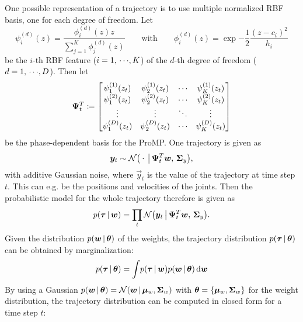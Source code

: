 			One possible representation of a trajectory is to use multiple normalized RBF basis, one for each degree of freedom. Let
			\begin{equation*}
				\psi_i^{(d)}(z) = \frac{\phi_i^{(d)}(z) z}{\sum_{j = 1}^{K} \phi_j^{(d)}(z)}
				\qquad\text{with}\qquad
				\phi_i^{(d)}(z) = \exp{ -\frac{1}{2} \frac{(z - c_i)^2}{h_i} }
			\end{equation*}
			be the \(i\)-th RBF feature (\( i = 1,\,\cdots\!,K \)) of the \(d\)-th degree of freedom (\( d = 1,\,\cdots\!,D \)). Then let
			\begin{equation*}
				\bm{\Psi}_t^T \coloneqq
				\begin{bmatrix}
					\psi_1^{(1)}(z_t) & \psi_2^{(1)}(z_t) & \cdots & \psi_K^{(1)}(z_t) \\
					\psi_1^{(2)}(z_t) & \psi_2^{(2)}(z_t) & \cdots & \psi_K^{(2)}(z_t) \\
					\vdots            & \vdots            & \ddots & \vdots            \\
					\psi_1^{(D)}(z_t) & \psi_2^{(D)}(z_t) & \cdots & \psi_K^{(D)}(z_t)
				\end{bmatrix}
			\end{equation*}
			be the phase-dependent basis for the ProMP. One trajectory is given as
			\begin{equation*}
				\bm{y}_t \sim \mathcal{N}\big( \cdot \,\big\vert\, \bm{\Psi}_t^T \bm{w},\, \bm{\Sigma}_y \big),
			\end{equation*}
			with additive Gaussian noise, where \( \vec{y}_t \) is the value of the trajectory at time step \(t\). This can e.g. be the positions and velocities of the joints. Then the probabilistic model for the whole trajectory therefore is given as
			\begin{equation*}
				p(\bm{\tau} \,\vert\, \bm{w}) = \prod_t \mathcal{N}\big( \bm{y}_t \,\big\vert\, \bm{\Psi}_t^T \bm{w},\, \bm{\Sigma}_y \big).
			\end{equation*}
			Given the distribution \( p(\bm{w} \,\vert\, \bm{\theta}) \) of the weights, the trajectory distribution \( p(\bm{\tau} \,\vert\, \bm{\theta}) \) can be obtained by marginalization:
			\begin{equation*}
				p(\bm{\tau} \,\vert\, \bm{\theta}) = \int\! p(\bm{\tau} \,\vert\, \bm{w}) p(\bm{w} \,\vert\, \bm{\theta}) \dd{\bm{w}}
			\end{equation*}
			By using a Gaussian \( p(\bm{w} \,\vert\, \bm{\theta}) = \mathcal{N}(\bm{w} \,\vert\, \bm{\mu}_w, \bm{\Sigma}_w) \) with \( \bm{\theta} = \{ \bm{\mu}_w, \bm{\Sigma}_w \} \) for the weight distribution, the trajectory distribution can be computed in closed form for a time step \(t\):
